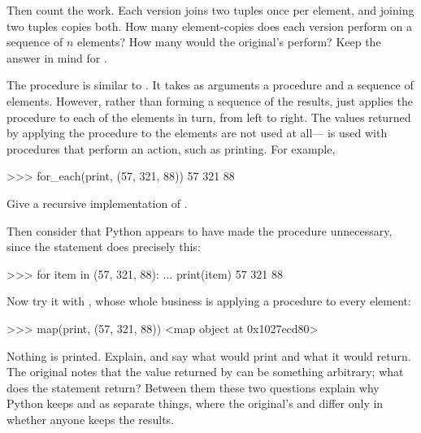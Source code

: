 \begin{exerciseGroup}
Then count the work.  Each version joins two tuples once per element, and
joining two tuples copies both.  How many element-copies does each version
perform on a sequence of \( n \) elements?  How many would the original's
 perform?  Keep the answer in mind for .

\label{Exercise 2.23}
 The procedure  is
similar to .  It takes as arguments a procedure and a sequence of
elements.  However, rather than forming a sequence of the results,
 just applies the procedure to each of the elements in turn,
from left to right. The values returned by applying the procedure to the
elements are not used at all--- is used with procedures that
perform an action, such as printing.  For example,

\begin{codeBlock}
>>> for_each(print, (57, 321, 88))
57
321
88
\end{codeBlock}

Give a recursive implementation of .

Then consider that Python appears to have made the procedure unnecessary, since
the  statement does precisely this:

\begin{codeBlock}
>>> for item in (57, 321, 88):
...     print(item)
57
321
88
\end{codeBlock}

Now try it with , whose whole business is applying a procedure to
every element:

\begin{codeBlock}
>>> map(print, (57, 321, 88))
<map object at 0x1027ecd80>
\end{codeBlock}

Nothing is printed.  Explain, and say what  would print and what it would return.  The original notes that the value
returned by  can be something arbitrary; what does the
 statement return?  Between them these two questions explain why
Python keeps  and  as separate things, where the original's
 and  differ only in whether anyone keeps the results.
\end{exerciseGroup}
